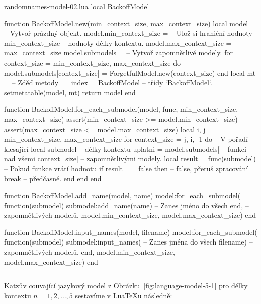 \documentclass{csbulletin}
\newcommand\myinputminted[3][]{%
  \inputminted[#1]{#2}{#3}%
}
\newcommand\myinputminted[3][]{%
  \inputminted[#1]{#2}{code-placeholder.#2}%
}
\begin{document}
\begin{filecontents}{randomnames-model-02.lua}
local BackoffModel = {}

function BackoffModel.new(min_context_size, max_context_size)
  local model = {}                  -- Vytvoř prázdný objekt.
  model.min_context_size =          -- Ulož si hraniční hodnoty
    min_context_size                -- hodnoty délky kontextu.
  model.max_context_size =
    max_context_size
  model.submodels = {}              -- Vytvoř zapomnětlivé modely.
  for context_size = min_context_size, max_context_size do
    model.submodels[context_size]
      = ForgetfulModel.new(context_size)
  end
  local mt = {                      -- Zděď metody
    __index = BackoffModel }        -- třídy `BackoffModel`.
  setmetatable(model, mt)
  return model
end

function BackoffModel.for_each_submodel(model, func,
                                        min_context_size,
                                        max_context_size)
  assert(min_context_size >= model.min_context_size)
  assert(max_context_size <= model.max_context_size)
  local i, j = min_context_size, max_context_size
  for context_size = j, i, -1 do    -- V pořadí klesající
    local submodel                  -- délky kontextu uplatni
      = model.submodels[            -- funkci nad všemi
        context_size]               -- zapomnětlivými modely.
    local result = func(submodel)   -- Pokud funkce vrátí hodnotu
    if result == false then         -- false, přeruš zpracování
      break                         -- předčasně.
    end
  end
end

function BackoffModel.add_name(model, name)
  model:for_each_submodel(
    function(submodel)
      submodel:add_name(name)       -- Zanes jméno do všech
    end,                            -- zapomnětlivých modelů.
    model.min_context_size,
    model.max_context_size)
end

function BackoffModel.input_names(model, filename)
  model:for_each_submodel(
    function(submodel)
      submodel:input_names(         -- Zanes jména do všech
        filename)                   -- zapomnětlivých modelů.
    end,
    model.min_context_size,
    model.max_context_size)
end
\end{filecontents}
\myinputminted{lua}{randomnames-model-02.lua}

Katzův couvající jazykový model z Obrázku~\ref{fig:language-model-5-1} pro délky kontextu $n=1, 2, \ldots, 5$ sestavíme v Lua\TeX u následně:
\end{document}
